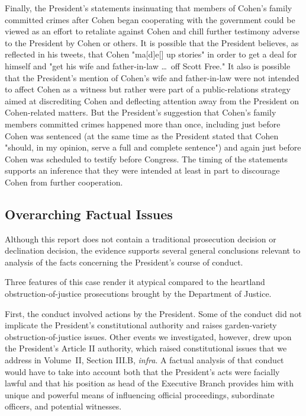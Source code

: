 {Finally, the President's statements insinuating that members of Cohen's family committed crimes after Cohen began cooperating with the government could be viewed as an effort to retaliate against Cohen and chill further testimony adverse to the President by Cohen or others.
It is possible that the President believes, as reflected in his tweets, that Cohen "ma[d]e[] up stories" in order to get a deal for himself and "get his wife and father-in-law \dots\ off Scott Free." It also is possible that the President's mention of Cohen's wife and father-in-law were not intended to affect Cohen as a witness but rather were part of a public-relations strategy aimed at discrediting Cohen and deflecting attention away from the President on Cohen-related matters.
But the President's suggestion that Cohen's family members committed crimes happened more than once, including just before Cohen was sentenced (at the same time as the President stated that Cohen "should, in my opinion, serve a full and complete sentence") and again just before Cohen was scheduled to testify before Congress.
The timing of the statements supports an inference that they were intended at least in part to discourage Cohen from further cooperation.

\subsection{Overarching Factual Issues}

Although this report does not contain a traditional prosecution decision or declination decision, the evidence supports several general conclusions relevant to analysis of the facts concerning the President's course of conduct.

Three features of this case render it atypical compared to the heartland obstruction-of-justice prosecutions brought by the Department of Justice.

First, the conduct involved actions by the President.
Some of the conduct did not implicate the President's constitutional authority and raises garden-variety obstruction-of-justice issues.
Other events we investigated, however, drew upon the President's Article II authority, which raised constitutional issues that we address in Volume~II, Section III.B, \textit{infra}.
A factual analysis of that conduct would have to take into account both that the President's acts were facially lawful and that his position as head of the Executive Branch provides him with unique and powerful means of influencing official proceedings, subordinate officers, and potential witnesses.

}
